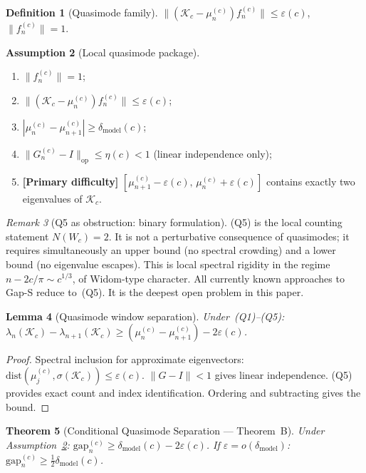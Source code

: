 \documentclass[12pt,a4paper]{amsart}
\newtheorem{theorem}{Theorem}[section]
\newtheorem{lemma}[theorem]{Lemma}
\theoremstyle{definition}
\newtheorem{definition}[theorem]{Definition}
\newtheorem{assumption}[theorem]{Assumption}
\theoremstyle{remark}
\newtheorem{remark}[theorem]{Remark}
\newcommand{\Kc}{\mathcal{K}_c}
\newcommand{\gap}[2]{\mathrm{gap}_{#2}^{(#1)}}
\newcommand{\op}{\mathrm{op}}
\begin{document}
\begin{definition}[Quasimode family]
$\|(\Kc - \mu_n^{(c)})f_n^{(c)}\| \leq \varepsilon(c)$,
$\|f_n^{(c)}\| = 1$.
\end{definition}

\begin{assumption}[Local quasimode package]
\label{ass:quasimode}
\begin{enumerate}[label=(Q\arabic*),nosep]
  \item $\|f_n^{(c)}\| = 1$;
  \item $\|(\Kc-\mu_n^{(c)})f_n^{(c)}\| \leq \varepsilon(c)$;
  \item $|\mu_n^{(c)}-\mu_{n+1}^{(c)}| \geq \delta_{\mathrm{model}}(c)$;
  \item $\|G_n^{(c)}-I\|_{\op} \leq \eta(c) < 1$
    (linear independence only);
  \item \textbf{[Primary difficulty]}
    $[\mu_{n+1}^{(c)}-\varepsilon(c),\,\mu_n^{(c)}+\varepsilon(c)]$
    contains exactly two eigenvalues of $\Kc$.
\end{enumerate}
\end{assumption}

\begin{remark}[Q5 as obstruction: binary formulation]
\label{rem:Q5}
(Q5) is the local counting statement $N(W_c) = 2$.
It is not a perturbative consequence of quasimodes;
it requires simultaneously an upper bound
(no spectral crowding) and a lower bound (no eigenvalue escapes).
This is local spectral rigidity in the regime $n - 2c/\pi \sim c^{1/3}$,
of Widom-type character.
All currently known approaches to Gap-S reduce to~(Q5).
It is the deepest open problem in this paper.
\end{remark}

\begin{lemma}[Quasimode window separation]
\label{lem:qmsep}
Under~(Q1)--(Q5):
$\lambda_n(\Kc) - \lambda_{n+1}(\Kc)
\geq (\mu_n^{(c)}-\mu_{n+1}^{(c)}) - 2\varepsilon(c)$.
\end{lemma}

\begin{proof}
Spectral inclusion for approximate eigenvectors:
$\mathrm{dist}(\mu_j^{(c)},\sigma(\Kc)) \leq \varepsilon(c)$.
$\|G-I\|<1$ gives linear independence.
(Q5) provides exact count and index identification.
Ordering and subtracting gives the bound.
\end{proof}

\begin{theorem}[Conditional Quasimode Separation --- Theorem~B]
\label{thm:B}
Under Assumption~\ref{ass:quasimode}:
$\gap{c}{n} \geq \delta_{\mathrm{model}}(c) - 2\varepsilon(c)$.
If $\varepsilon = o(\delta_{\mathrm{model}})$:
$\gap{c}{n} \geq \tfrac{1}{2}\delta_{\mathrm{model}}(c)$.
\end{theorem}
\end{document}
